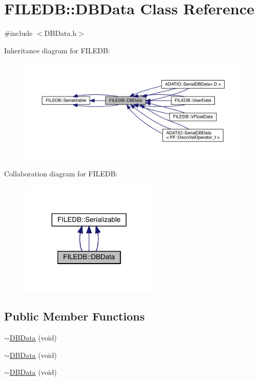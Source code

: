 \hypertarget{classFILEDB_1_1DBData}{}\section{F\+I\+L\+E\+DB\+:\+:D\+B\+Data Class Reference}
\label{classFILEDB_1_1DBData}


{\ttfamily \#include $<$D\+B\+Data.\+h$>$}



Inheritance diagram for F\+I\+L\+E\+DB\+:
\nopagebreak
\begin{figure}[H]
\begin{center}
\leavevmode
\includegraphics[width=350pt]{d5/dc8/classFILEDB_1_1DBData__inherit__graph}
\end{center}
\end{figure}


Collaboration diagram for F\+I\+L\+E\+DB\+:
\nopagebreak
\begin{figure}[H]
\begin{center}
\leavevmode
\includegraphics[width=188pt]{d9/dde/classFILEDB_1_1DBData__coll__graph}
\end{center}
\end{figure}
\subsection*{Public Member Functions}
\begin{DoxyCompactItemize}
\item 
\mbox{\hyperlink{classFILEDB_1_1DBData_afb154d074a887601e48853bb5b7089b5}{$\sim$\+D\+B\+Data}} (void)
\item 
\mbox{\hyperlink{classFILEDB_1_1DBData_afb154d074a887601e48853bb5b7089b5}{$\sim$\+D\+B\+Data}} (void)
\item 
\mbox{\hyperlink{classFILEDB_1_1DBData_afb154d074a887601e48853bb5b7089b5}{$\sim$\+D\+B\+Data}} (void)
\end{DoxyCompactItemize}
